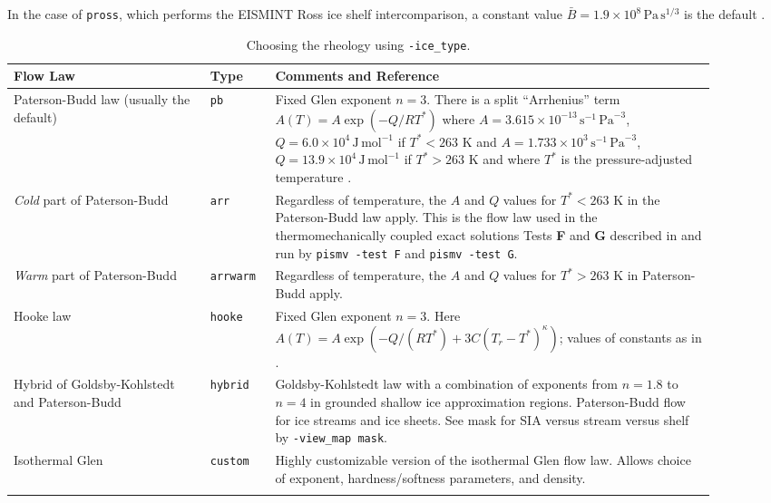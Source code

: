 \documentclass[11pt,final]{amsart}
\renewcommand{\t}[1]{\texttt{#1}}
\newcommand{\ind}[1]{\index{general}{#1}}
\begin{document}
In the case of \texttt{pross}, which performs the EISMINT Ross ice shelf intercomparison, a constant value $\bar B = 1.9 \times 10^8 \, \text{Pa}\, \text{s}^{1/3}$ is the default \cite{MacAyealetal}.

\begin{table}[ht]
\caption{Choosing the rheology using \t{-ice\_type}.}\label{tab:flowlaw}\ind{rheology}\ind{flow law}
\small
\begin{tabular}{p{0.25\linewidth}p{0.08\linewidth}p{0.57\linewidth}}\hline
\textbf{Flow Law} & \textbf{Type} & \textbf{Comments and Reference} \\ \hline
Paterson-Budd law (usually the default)  &  \t{pb} &   Fixed Glen exponent $n=3$.  There is a split ``Arrhenius'' term $A(T) = A \exp(-Q/RT^*)$ where \mbox{$A = 3.615 \times 10^{-13}\, \text{s}^{-1}\, \text{Pa}^{-3}$}, \mbox{$Q = 6.0 \times 10^4\, \text{J}\, \text{mol}^{-1}$} if $T^* < 263$ K and
 \mbox{$A = 1.733 \times 10^{3}\, \text{s}^{-1}\, \text{Pa}^{-3}$}, \mbox{$Q = 13.9 \times 10^4\, \text{J}\, \text{mol}^{-1}$} if $T^* > 263$ K and where $T^*$ is the pressure-adjusted temperature \cite{PatersonBudd}. \\
\emph{Cold} part of Paterson-Budd &  \t{arr} &   Regardless of temperature, the $A$ and $Q$ values for $T^*<263$ K in  the Paterson-Budd law apply.  This is the flow law used in the thermomechanically coupled exact solutions Tests \textbf{F} and \textbf{G} described in \cite{BBL,BB} and run by \texttt{pismv -test F} and \texttt{pismv -test G}. \\

\emph{Warm} part of Paterson-Budd     &  \t{arrwarm} & Regardless of temperature, the $A$ and $Q$ values for $T^*>263$ K in Paterson-Budd apply.\\
Hooke law   &  \t{hooke} &  Fixed Glen exponent $n=3$.  Here  $A(T) = A \exp(-Q/(RT^*) + 3C (T_r - T^*)^\kappa)$; values of  constants as in \cite{Hooke,PayneBaldwin}.\\
Hybrid of Goldsby-Kohlstedt and Paterson-Budd & \t{hybrid} &     Goldsby-Kohlstedt law with a combination of exponents  from $n=1.8$ to $n=4$ \cite{GoldsbyKohlstedt} in grounded  shallow ice approximation regions.  Paterson-Budd flow  for ice streams and ice sheets. See mask for SIA versus stream versus shelf by \texttt{-view_map mask}. \\
Isothermal Glen & \t{custom} & Highly customizable version of the isothermal Glen flow law.  Allows choice of exponent, hardness/softness parameters, and density. \\
\hline
\normalsize	
\end{tabular}
\end{table}
\end{document}
